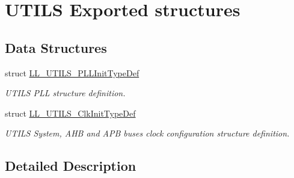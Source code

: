 \hypertarget{group___u_t_i_l_s___l_l___e_s___i_n_i_t}{}\section{U\+T\+I\+LS Exported structures}
\label{group___u_t_i_l_s___l_l___e_s___i_n_i_t}
\subsection*{Data Structures}
\begin{DoxyCompactItemize}
\item 
struct \hyperlink{struct_l_l___u_t_i_l_s___p_l_l_init_type_def}{L\+L\+\_\+\+U\+T\+I\+L\+S\+\_\+\+P\+L\+L\+Init\+Type\+Def}
\begin{DoxyCompactList}\small\item\em U\+T\+I\+LS P\+LL structure definition. \end{DoxyCompactList}\item 
struct \hyperlink{struct_l_l___u_t_i_l_s___clk_init_type_def}{L\+L\+\_\+\+U\+T\+I\+L\+S\+\_\+\+Clk\+Init\+Type\+Def}
\begin{DoxyCompactList}\small\item\em U\+T\+I\+LS System, A\+HB and A\+PB buses clock configuration structure definition. \end{DoxyCompactList}\end{DoxyCompactItemize}


\subsection{Detailed Description}
